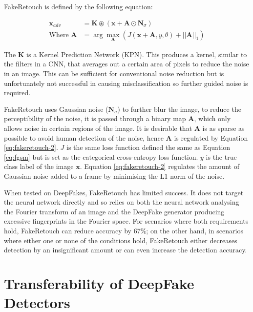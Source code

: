FakeRetouch is defined by the following equation:

\begin{align}
    \mathbf{x}_{adv} &= \mathbf{K} \circledast (\mathbf{x} + \mathbf{A}\odot \mathbf{N}_{\sigma}) \label{eq:fakeretouch-1}\\
    \text{Where } \mathbf{A} &= \arg \max_{\mathbf{A}} \left(J(\mathbf{x}+\mathbf{A},y,\theta)+||\mathbf{A}||_1\right) \label{eq:fakeretouch-2}
\end{align}

The $\mathbf{K}$ is a Kernel Prediction Network (KPN)\cite{mildenhall2018burst}. This produces a kernel, similar to the filters in a CNN, that averages out a certain area of pixels to reduce the noise in an image. This can be sufficient for conventional noise reduction but is unfortunately not successful in causing misclassification\cite{huang2020fakeretouch} so further guided noise is required.

FakeRetouch uses Gaussian noise ($\textbf{N}_{\sigma}$) to further blur the image, to reduce the perceptibility of the noise, it is passed through a binary map $\textbf{A}$, which only allows noise in certain regions of the image. It is desirable that $\textbf{A}$ is as sparse as possible to avoid human detection of the noise, hence $\textbf{A}$ is regulated by Equation \ref{eq:fakeretouch-2}. $J$ is the same loss function defined the same as Equation \ref{eq:fgsm} but is set as the categorical cross-entropy loss function. $y$ is the true class label of the image $\textbf{x}$. Equation \ref{eq:fakeretouch-2} regulates the amount of Gaussian noise added to a frame by minimising the L1-norm of the noise.

When tested on DeepFakes, FakeRetouch has limited success. It does not target the neural network directly and so relies on both the neural network analysing the Fourier transform of an image and the DeepFake generator producing excessive fingerprints in the Fourier space. For scenarios where both requirements hold, FakeRetouch can reduce accuracy by 67\%; on the other hand, in scenarios where either one or none of the conditions hold, FakeRetouch either decreases detection by an insignificant amount or can even increase the detection accuracy.

\section{Transferability of DeepFake Detectors}


